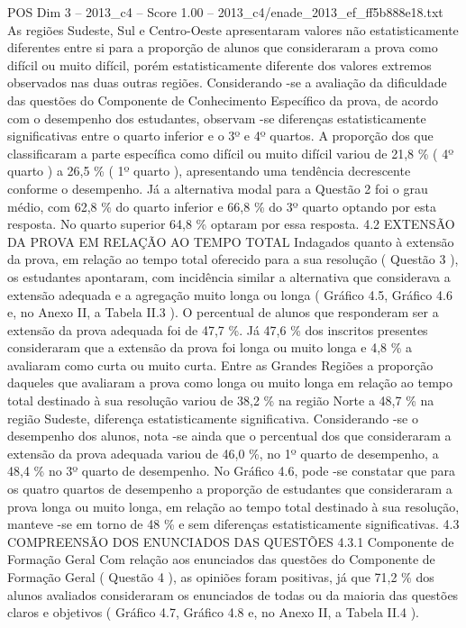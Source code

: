 \begin{textsample}{POS Dim 3 – 2013\_c4 – Score 1.00 – 2013\_c4/enade\_2013\_ef\_ff5b888e18.txt}
As regiões Sudeste, Sul e Centro-Oeste apresentaram valores não estatisticamente diferentes entre si para a proporção de alunos que consideraram a prova como difícil ou muito difícil, porém estatisticamente diferente dos valores extremos observados nas duas outras regiões.
Considerando -se a avaliação da dificuldade das questões do Componente de Conhecimento Específico da prova, de acordo com o desempenho dos estudantes, observam -se diferenças estatisticamente significativas entre o quarto inferior e o 3º e 4º quartos.
A proporção dos que classificaram a parte específica como difícil ou muito difícil variou de 21,8 \% ( 4º quarto ) a 26,5 \% ( 1º quarto ), apresentando uma tendência decrescente conforme o desempenho.
Já a alternativa modal para a Questão 2 foi o grau médio, com 62,8 \% do quarto inferior e 66,8 \% do 3º quarto optando por esta resposta.
No quarto superior 64,8 \% optaram por essa resposta. 4.2 EXTENSÃO DA PROVA EM RELAÇÃO AO TEMPO TOTAL Indagados quanto à extensão da prova, em relação ao tempo total oferecido para a sua resolução ( Questão 3 ), os estudantes apontaram, com incidência similar a alternativa que considerava a extensão adequada e a agregação muito longa ou longa ( Gráfico 4.5, Gráfico 4.6 e, no Anexo II, a Tabela II.3 ).
O percentual de alunos que responderam ser a extensão da prova adequada foi de 47,7 \%.
Já 47,6 \% dos inscritos presentes consideraram que a extensão da prova foi longa ou muito longa e 4,8 \% a avaliaram como curta ou muito curta.
Entre as Grandes Regiões a proporção daqueles que avaliaram a prova como longa ou muito longa em relação ao tempo total destinado à sua resolução variou de 38,2 \% na região Norte a 48,7 \% na região Sudeste, diferença estatisticamente significativa.
Considerando -se o desempenho dos alunos, nota -se ainda que o percentual dos que consideraram a extensão da prova adequada variou de 46,0 \%, no 1º quarto de desempenho, a 48,4 \% no 3º quarto de desempenho.
No Gráfico 4.6, pode -se constatar que para os quatro quartos de desempenho a proporção de estudantes que consideraram a prova longa ou muito longa, em relação ao tempo total destinado à sua resolução, manteve -se em torno de 48 \% e sem diferenças estatisticamente significativas. 4.3 COMPREENSÃO DOS ENUNCIADOS DAS QUESTÕES 4.3.1 Componente de Formação Geral Com relação aos enunciados das questões do Componente de Formação Geral ( Questão 4 ), as opiniões foram positivas, já que 71,2 \% dos alunos avaliados consideraram os enunciados de todas ou da maioria das questões claros e objetivos ( Gráfico 4.7, Gráfico 4.8 e, no Anexo II, a Tabela II.4 ).

\end{textsample}
